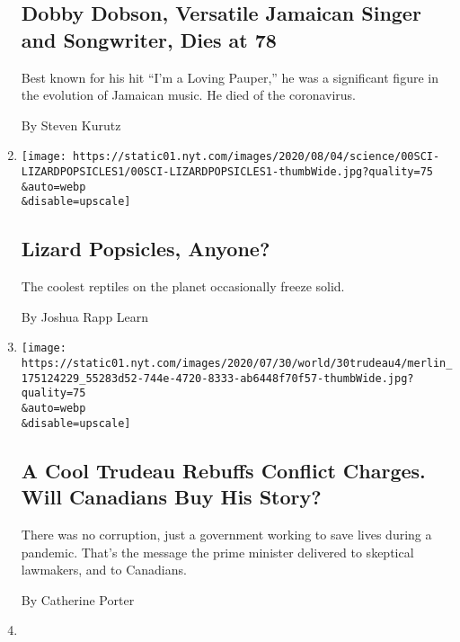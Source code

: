 \begin{enumerate}
  \hypertarget{dobby-dobson-versatile-jamaican-singer-and-songwriter-dies-at-78}{%
  \subsection{Dobby Dobson, Versatile Jamaican Singer and Songwriter,
  Dies at
  78}\label{dobby-dobson-versatile-jamaican-singer-and-songwriter-dies-at-78}}

  Best known for his hit ``I'm a Loving Pauper,'' he was a significant
  figure in the evolution of Jamaican music. He died of the coronavirus.

  By Steven Kurutz
\item
  \href{/2020/07/31/science/lizards-liolaemus-argentina.html}{}

  \texttt{[image: https://static01.nyt.com/images/2020/08/04/science/00SCI-LIZARDPOPSICLES1/00SCI-LIZARDPOPSICLES1-thumbWide.jpg?quality=75\\\&auto=webp\\\&disable=upscale]}

  \hypertarget{lizard-popsicles-anyone}{%
  \subsection{Lizard Popsicles, Anyone?}\label{lizard-popsicles-anyone}}

  The coolest reptiles on the planet occasionally freeze solid.

  By Joshua Rapp Learn
\item
  \href{/2020/07/30/world/canada/justin-trudeau-we-charity.html}{}

  \texttt{[image: https://static01.nyt.com/images/2020/07/30/world/30trudeau4/merlin\_175124229\_55283d52-744e-4720-8333-ab6448f70f57-thumbWide.jpg?quality=75\\\&auto=webp\\\&disable=upscale]}

  \hypertarget{a-cool-trudeau-rebuffs-conflict-charges-will-canadians-buy-his-story}{%
  \subsection{A Cool Trudeau Rebuffs Conflict Charges. Will Canadians
  Buy His
  Story?}\label{a-cool-trudeau-rebuffs-conflict-charges-will-canadians-buy-his-story}}

  There was no corruption, just a government working to save lives
  during a pandemic. That's the message the prime minister delivered to
  skeptical lawmakers, and to Canadians.

  By Catherine Porter
\item
  \href{/2020/07/29/world/americas/lead-poisoning-children.html}{}


\end{enumerate}

